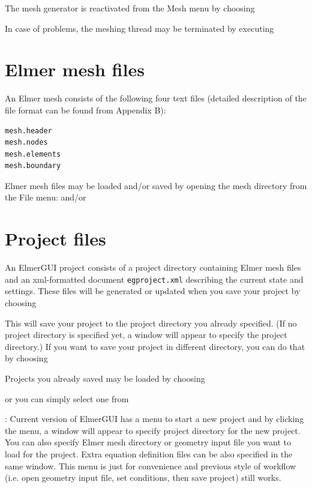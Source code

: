 The mesh generator is reactivated from the Mesh menu by choosing

\noindent In case of problems, the meshing thread may be terminated by executing 

\section{Elmer mesh files}

An Elmer mesh consists of the following four text files (detailed description of the file
format can be found from Appendix B):

\begin{footnotesize}
\begin{verbatim}
mesh.header 
mesh.nodes 
mesh.elements 
mesh.boundary 
\end{verbatim}
\end{footnotesize}

Elmer mesh files may be loaded and/or saved by opening the mesh directory from the File menu:
\noindent and/or

\section{Project files}

An ElmerGUI project consists of a project directory containing Elmer mesh files and an xml-formatted 
document {\tt egproject.xml} describing the current state and settings. These files will be generated or updated when you save your project by choosing


This will save your project to the project directory you already specified. (If no project directory is specified yet, a window will appear to specify the project directory.) If you want to save your project in different directory, you can do that by choosing


\noindent Projects you already saved may be loaded by choosing


\noindent or you can simply select one from

\vspace{3mm}
: Current version of ElmerGUI has a menu to start a new project 
 \noindent and by clicking the menu, a window will appear to specify project directory for the new project. You can also specify Elmer mesh directory or geometry input file you want to load for the project. Extra equation definition files can be also specified in the same window. This menu is just for convenience and previous style of workflow (i.e. open geometry input file, set conditions, then save project) still works.

